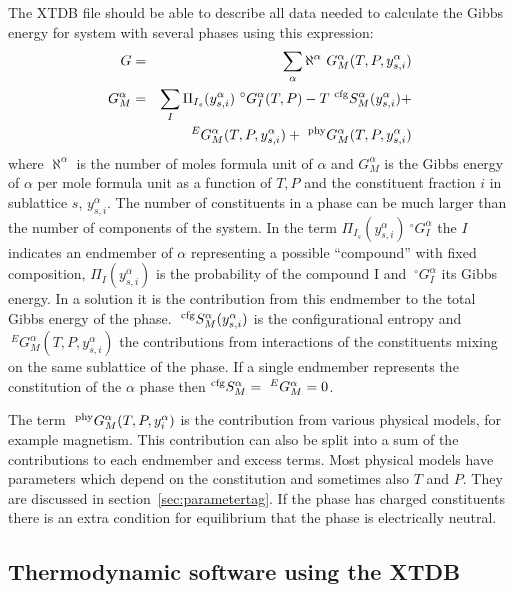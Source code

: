 \documentclass{article}
\begin{document}
The XTDB file should be able to describe all data needed to calculate
the Gibbs energy for system with several phases using this expression:
\begin{eqnarray}
  G &=& \sum_{\alpha} \aleph^{\alpha} ~ G^{\alpha}_M(T,P,y^{\alpha}_{s,i}) \label{eq:gphase}\\
  G^{\alpha}_M &=& \sum_I \Pi_{I_s}(y^{\alpha}_{s,i}) ~^{\circ}G^{\alpha}_I(T,P) - T~^{\rm cfg}S^{\alpha}_M(y^{\alpha}_{s,i}) + \nonumber\\&&
  ~^EG^{\alpha}_M(T,P,y^{\alpha}_{s,i}) + ~^{\rm phy}G^{\alpha}_M(T,P,y^{\alpha}_{s,i}) \label{eq:gmodel}
\end{eqnarray}
where $\aleph^{\alpha}$ is the number of moles formula unit of
$\alpha$ and $G^{\alpha}_M$ is the Gibbs energy of $\alpha$ per mole
formula unit as a function of $T,P$ and the constituent fraction $i$
in sublattice $s$, $y^{\alpha}_{s,i}$.  The number of constituents in
a phase can be much larger than the number of components of the
system.  In the term $\Pi_{I_s}(y^{\alpha}_{s,i})~^{\circ}G^{\alpha}_I$ the
$I$ indicates an endmember of $\alpha$ representing a possible
``compound'' with fixed composition, $\Pi_I(y^{\alpha}_{s,i})$ is the
probability of the compound I and $~^{\circ}G^{\alpha}_I$ its Gibbs
energy.  In a solution it is the contribution from this endmember to
the total Gibbs energy of the phase.  $~^{\rm
  cfg}S^{\alpha}_M(y^{\alpha}_{s,i})$ is the configurational entropy and
$~^EG^{\alpha}_M(T,P,y^{\alpha}_{s,i})$ the contributions from
interactions of the constituents mixing on the same sublattice of the
phase.  If a single endmember represents the constitution of the
$\alpha$ phase then $^{\rm cfg}S^{\alpha}_M = ~^EG^{\alpha}_M = 0$.

The term $~^{\rm phy}G^{\alpha}_M(T,P,y^{\alpha}_i)$ is the
contribution from various physical models, for example magnetism.
This contribution can also be split into a sum of the contributions to
each endmember and excess terms.  Most physical models have parameters
which depend on the constitution and sometimes also $T$ and $P$.  They
are discussed in section~\ref{sec:parametertag}.  If the phase has
charged constituents there is an extra condition for equilibrium that
the phase is electrically neutral.


\subsection{Thermodynamic software using the XTDB}\label{sec:software}
\end{document}
